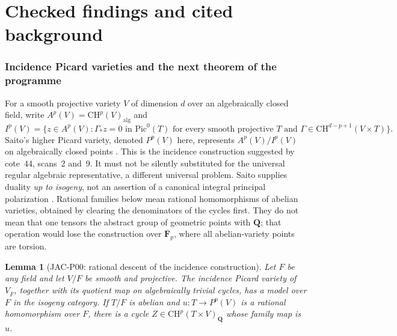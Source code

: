 \documentclass[11pt,a4paper]{article}
\newtheorem{lemma}[theorem]{Lemma}
\begin{document}
\part{Checked findings and cited background}

\section{Incidence Picard varieties and the next theorem of the programme}

For a smooth projective variety $V$ of dimension $d$ over an algebraically
closed field, write $A^p(V)=\mathrm{CH}^p(V)_{\mathrm{alg}}$ and
\[
 I^p(V)=\{z\in A^p(V):\Gamma_*z=0\text{ in }\mathrm{Pic}^0(T)
 \text{ for every smooth projective }T
 \text{ and }\Gamma\in\mathrm{CH}^{d-p+1}(V\times T)\}.
\]
Saito's higher Picard variety, denoted $P^p(V)$ here, represents
$A^p(V)/I^p(V)$ on algebraically closed points
\cite[Theorem~(3.6)(i)]{Saito1979}.
This is the incidence construction suggested by cote~44, scans~2 and~9.
It must not be silently substituted for the universal regular algebraic
representative, a different universal problem.  Saito supplies duality
\emph{up to isogeny}, not an assertion of a canonical integral principal
polarization \cite[Proposition~(4.4)]{Saito1979}.
Rational families below mean rational homomorphisms of abelian varieties,
obtained by clearing the denominators of the cycles first.  They do not
mean that one tensors the abstract group of geometric points with
$\mathbf Q$; that operation would lose the construction over
$\overline{\mathbf F}_p$, where all abelian-variety points are torsion.

\begin{lemma}[JAC-P00: rational descent of the incidence construction]
\label{jac:P00}
Let $F$ be any field and let $V/F$ be smooth and projective.  The
incidence Picard variety of $V_{\overline F}$, together with its quotient
map on algebraically trivial cycles, has a model over $F$ in the isogeny
category.  If $T/F$ is abelian and $u:T\to P^p(V)$ is a rational
homomorphism over $F$, there is a cycle
$Z\in\mathrm{CH}^p(T\times V)_{\mathbf Q}$ whose family map is $u$.
\end{lemma}
\end{document}
